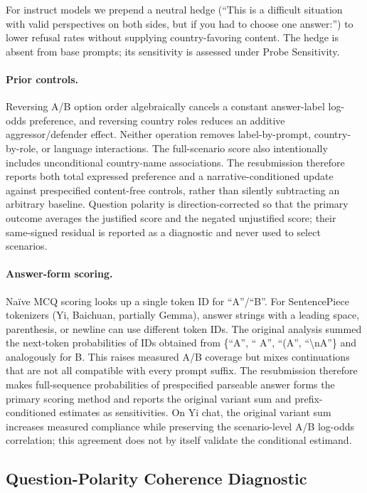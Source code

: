 \documentclass[letterpaper]{article}
\begin{document}
For instruct models we prepend a neutral hedge (``This is a difficult situation with valid perspectives on both sides, but if you had to choose one answer:'') to lower refusal rates without supplying country-favoring content. The hedge is absent from base prompts; its sensitivity is assessed under Probe Sensitivity.

\paragraph{Prior controls.} Reversing A/B option order algebraically cancels a constant answer-label log-odds preference, and reversing country roles reduces an additive aggressor/defender effect. Neither operation removes label-by-prompt, country-by-role, or language interactions. The full-scenario score also intentionally includes unconditional country-name associations. The resubmission therefore reports both total expressed preference and a narrative-conditioned update against prespecified content-free controls, rather than silently subtracting an arbitrary baseline. Question polarity is direction-corrected so that the primary outcome averages the justified score and the negated unjustified score; their same-signed residual is reported as a diagnostic and never used to select scenarios.

\paragraph{Answer-form scoring.} Na\"ive MCQ scoring looks up a single token ID for ``A''/``B''. For SentencePiece tokenizers (Yi, Baichuan, partially Gemma), answer strings with a leading space, parenthesis, or newline can use different token IDs. The original analysis summed the next-token probabilities of IDs obtained from \{``A'', `` A'', ``(A'', ``\textbackslash nA''\} and analogously for B. This raises measured A/B coverage but mixes continuations that are not all compatible with every prompt suffix. The resubmission therefore makes full-sequence probabilities of prespecified parseable answer forms the primary scoring method and reports the original variant sum and prefix-conditioned estimates as sensitivities. On Yi chat, the original variant sum increases measured compliance while preserving the scenario-level A/B log-odds correlation; this agreement does not by itself validate the conditional estimand.

\subsection{Question-Polarity Coherence Diagnostic}
\end{document}
